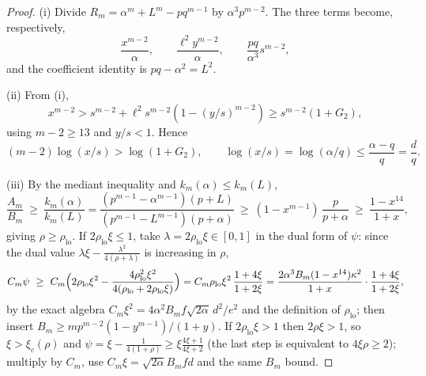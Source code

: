 \documentclass[11pt]{article}
\begin{document}
\begin{proof}
(i) Divide $R_m=\alpha^m+L^m-pq^{m-1}$ by
$\alpha^3p^{m-2}$.  The three terms become, respectively,
\[
 \frac{x^{m-2}}{\alpha},\qquad
 \frac{\ell^2y^{m-2}}{\alpha},\qquad
 \frac{pq}{\alpha^3}s^{m-2},
\]
and the coefficient identity is $pq-\alpha^2=L^2$.

(ii) From (i),
\[
 x^{m-2}>
 s^{m-2}+\ell^2s^{m-2}\left(1-(y/s)^{m-2}\right)
 \ge s^{m-2}(1+G_2),
\]
using $m-2\ge13$ and $y/s<1$.  Hence
\[
 (m-2)\log(x/s)>\log(1+G_2),
 \qquad
 \log(x/s)=\log(\alpha/q)\le\frac{\alpha-q}{q}=\frac dq.
\]

(iii) By the mediant inequality and $k_m(\alpha)\le k_m(L)$,
\[
        \frac{A_m}{B_m}\ \ge\ \frac{k_m(\alpha)}{k_m(L)}
        =\frac{(p^{m-1}-\alpha^{m-1})(p+L)}{(p^{m-1}-L^{m-1})(p+\alpha)}
        \ \ge\ (1-x^{m-1})\,\frac{p}{p+\alpha}
        \ \ge\ \frac{1-x^{14}}{1+x},
\]
giving $\rho\ge\rho_{\mathrm{lo}}$.
If $2\rho_{\mathrm{lo}}\xi\le1$, take $\lambda=2\rho_{\mathrm{lo}}\xi\in[0,1]$
in the dual form of $\psi$: since the dual value
$\lambda\xi-\frac{\lambda^2}{4(\rho+\lambda)}$ is increasing in $\rho$,
\[
        C_m\psi\ \ge\
        C_m\Bigl(2\rho_{\mathrm{lo}}\xi^2
        -\frac{4\rho_{\mathrm{lo}}^2\xi^2}{4(\rho_{\mathrm{lo}}
        +2\rho_{\mathrm{lo}}\xi)}\Bigr)
        =C_m\rho_{\mathrm{lo}}\xi^2\,\frac{1+4\xi}{1+2\xi}
        =\frac{2\alpha^3B_m(1-x^{14})\kappa^2}{1+x}\cdot\frac{1+4\xi}{1+2\xi},
\]
by the exact algebra $C_m\xi^2=4\alpha^2B_mf\sqrt{2\alpha}\,d^2/e^2$ and the
definition of $\rho_{\mathrm{lo}}$; then insert
$B_m\ge mp^{m-2}(1-y^{m-1})/(1+y)$.  If $2\rho_{\mathrm{lo}}\xi>1$ then
$2\rho\xi>1$, so $\xi>\xi_c(\rho)$ and
$\psi=\xi-\frac1{4(1+\rho)}\ge\xi\frac{4\xi+1}{4\xi+2}$
(the last step is equivalent to $4\xi\rho\ge2$); multiply by
$C_m$, use $C_m\xi=\sqrt{2\alpha}B_mfd$ and the same $B_m$ bound.
\end{proof}
\end{document}
